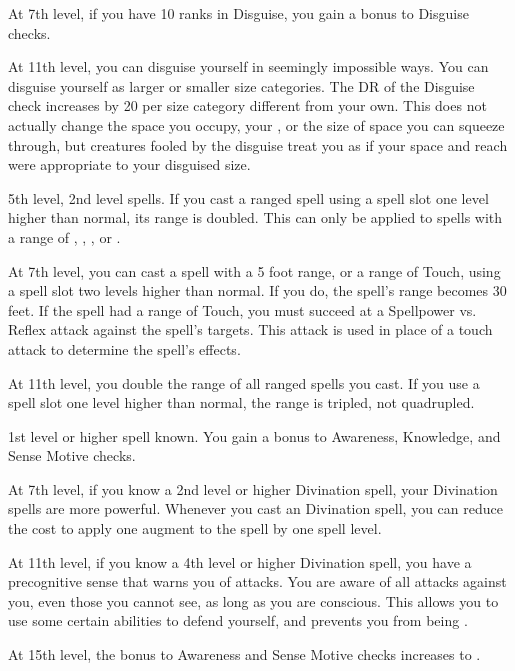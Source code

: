    At 7th level, if you have 10 ranks in Disguise, you gain a  bonus to Disguise checks.

    At 11th level, you can disguise yourself in seemingly impossible ways.
    You can disguise yourself as larger or smaller size categories.
    The DR of the Disguise check increases by 20 per size category different from your own.
    This does not actually change the space you occupy, your , or the size of space you can squeeze through, but creatures fooled by the disguise treat you as if your space and reach were appropriate to your disguised size.

    \featpre 5th level, 2nd level spells.
    \featben If you cast a ranged spell using a spell slot one level higher than normal, its range is doubled.
    This can only be applied to spells with a range of \rngclose, \rngmed, \rnglong, or \rngext.

    At 7th level, you can cast a spell with a 5 foot range, or a range of Touch, using a spell slot two levels higher than normal.
    If you do, the spell's range becomes 30 feet.
    If the spell had a range of Touch, you must succeed at a Spellpower vs. Reflex attack against the spell's targets.
    This attack is used in place of a touch attack to determine the spell's effects.

    At 11th level, you double the range of all ranged spells you cast.
    If you use a spell slot one level higher than normal, the range is tripled, not quadrupled.

    \featpre 1st level or higher  spell known.
    \featben You gain a  bonus to Awareness, Knowledge, and Sense Motive checks.

    At 7th level, if you know a 2nd level or higher Divination spell, your Divination spells are more powerful.
    Whenever you cast an Divination spell, you can reduce the cost to apply one augment to the spell by one spell level.

    At 11th level, if you know a 4th level or higher Divination spell, you have a precognitive sense that warns you of attacks.
    You are aware of all attacks against you, even those you cannot see, as long as you are conscious.
    This allows you to use some certain abilities to defend yourself, and prevents you from being \unaware.

    At 15th level, the bonus to Awareness and Sense Motive checks increases to .


